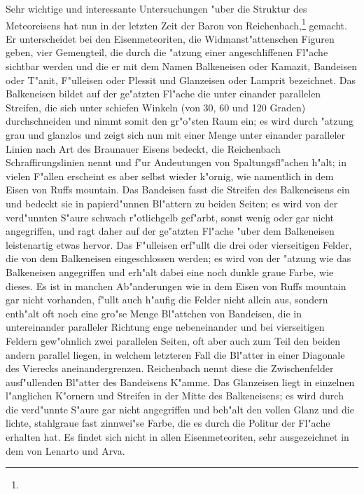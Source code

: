 \documentclass[a4paper, 11pt, oneside]{article}
\begin{document}
Sehr wichtige und interessante Untersuchungen "uber die Struktur des Meteoreisens hat nun in der letzten Zeit der Baron von Reichenbach,\footnote{} gemacht. Er unterscheidet bei den Eisenmeteoriten, die Widmanst"attenschen Figuren geben, vier Gemengteil, die durch die "atzung einer angeschliffenen Fl"ache sichtbar werden und die er mit dem Namen Balkeneisen oder Kamazit, Bandeisen oder T"anit, F"ulleisen oder Plessit und Glanzeisen oder Lamprit bezeichnet. Das Balkeneisen bildet auf der ge"atzten Fl"ache die unter einander parallelen Streifen, die sich unter schiefen Winkeln (von 30, 60 und 120 Graden) durchschneiden und nimmt somit den gr"o"sten Raum ein; es wird durch "atzung grau und glanzlos und zeigt sich nun mit einer Menge unter einander paralleler Linien nach Art des Braunauer Eisens bedeckt, die Reichenbach Schraffirungslinien nennt und f"ur Andeutungen von Spaltungsfl"achen h"alt; in vielen F"allen erscheint es aber selbst wieder k"ornig, wie namentlich in dem Eisen von Ruffs mountain. Das Bandeisen fasst die Streifen des Balkeneisens ein und bedeckt sie in papierd"unnen Bl"attern zu beiden Seiten; es wird von der verd"unnten S"aure schwach r"otlichgelb gef"arbt, sonst wenig oder gar nicht angegriffen, und ragt daher auf der ge"atzten Fl"ache "uber dem Balkeneisen leistenartig etwas hervor. Das F"ulleisen erf"ullt die drei oder vierseitigen Felder, die von dem Balkeneisen eingeschlossen werden; es wird von der "atzung wie das Balkeneisen angegriffen und erh"alt dabei eine noch dunkle graue Farbe, wie dieses. Es ist in manchen Ab"anderungen wie in dem Eisen von Ruffs mountain gar nicht vorhanden, f"ullt auch h"aufig die Felder nicht allein aus, sondern enth"alt oft noch eine gro"se Menge Bl"attchen von Bandeisen, die in untereinander paralleler Richtung enge nebeneinander und bei vierseitigen Feldern gew"ohnlich zwei parallelen Seiten, oft aber auch zum Teil den beiden andern parallel liegen, in welchem letzteren Fall die Bl"atter in einer Diagonale des Vierecks aneinandergrenzen. Reichenbach nennt diese die Zwischenfelder ausf"ullenden Bl"atter des Bandeisens K"amme. Das Glanzeisen liegt in einzelnen l"anglichen K"ornern und Streifen in der Mitte des Balkeneisens; es wird durch die verd"unnte S"aure gar nicht angegriffen und beh"alt den vollen Glanz und die lichte, stahlgraue fast zinnwei"se Farbe, die es durch die Politur der Fl"ache erhalten hat. Es findet sich nicht in allen Eisenmeteoriten, sehr ausgezeichnet in dem von Lenarto und Arva.
\end{document}

